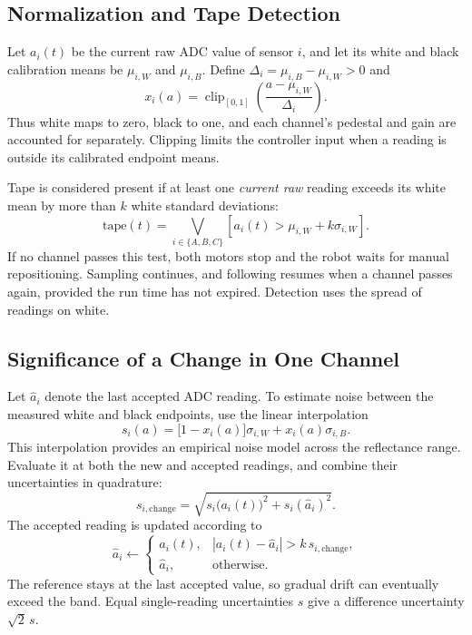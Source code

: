 \subsection{Normalization and Tape Detection}
Let $a_i(t)$ be the current raw ADC value of sensor $i$, and let its white and black calibration means be $\mu_{i,W}$ and $\mu_{i,B}$. Define $\Delta_i=\mu_{i,B}-\mu_{i,W}>0$ and
\begin{equation}
x_i(a)=\operatorname{clip}_{[0,1]}\!\left(\frac{a-\mu_{i,W}}{\Delta_i}\right).
\label{eq:lf-normalize}
\end{equation}
Thus white maps to zero, black to one, and each channel's pedestal and gain are accounted for separately. Clipping limits the controller input when a reading is outside its calibrated endpoint means.

Tape is considered present if at least one \emph{current raw} reading exceeds its white mean by more than $k$ white standard deviations:
\begin{equation}
\mathrm{tape}(t)=\bigvee_{i\in\{A,B,C\}}
\left[a_i(t)>\mu_{i,W}+k\sigma_{i,W}\right].
\label{eq:lf-tape}
\end{equation}
If no channel passes this test, both motors stop and the robot waits for manual repositioning. Sampling continues, and following resumes when a channel passes again, provided the run time has not expired. Detection uses the spread of readings on white.

\subsection{Significance of a Change in One Channel}
Let $\widehat a_i$ denote the last accepted ADC reading. To estimate noise between the measured white and black endpoints, use the linear interpolation
\begin{equation}
s_i(a)=\bigl[1-x_i(a)\bigr]\sigma_{i,W}+x_i(a)\sigma_{i,B}.
\label{eq:lf-noise-model}
\end{equation}
This interpolation provides an empirical noise model across the reflectance range. Evaluate it at both the new and accepted readings, and combine their uncertainties in quadrature:
\begin{equation}
s_{i,\mathrm{change}}=
\sqrt{s_i\bigl(a_i(t)\bigr)^2+s_i(\widehat a_i)^2}.
\end{equation}
The accepted reading is updated according to
\begin{equation}
\widehat a_i\leftarrow
\begin{cases}
a_i(t),& |a_i(t)-\widehat a_i|>k\,s_{i,\mathrm{change}},\\
\widehat a_i,& \text{otherwise}.
\end{cases}
\label{eq:lf-update}
\end{equation}
The reference stays at the last accepted value, so gradual drift can eventually exceed the band. Equal single-reading uncertainties $s$ give a difference uncertainty $\sqrt{2}\,s$.

